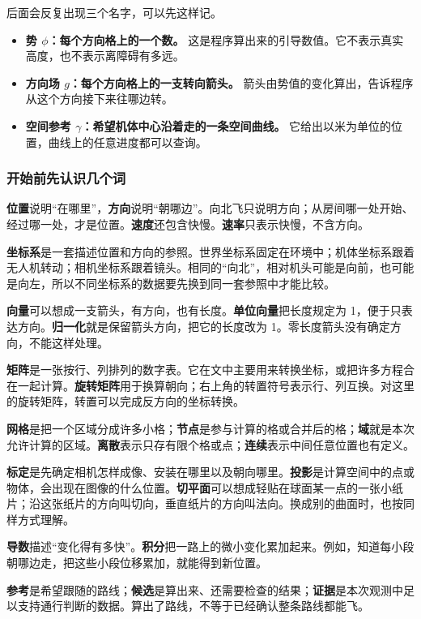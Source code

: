 \documentclass[12pt,a4paper]{article}
\numberwithin{equation}{topic}
\begin{document}
后面会反复出现三个名字，可以先这样记。
\begin{itemize}
\item \textbf{势 \(\phi\)：每个方向格上的一个数。} 这是程序算出来的引导数值。它不表示真实高度，也不表示离障碍有多远。
\item \textbf{方向场 \(g\)：每个方向格上的一支转向箭头。} 箭头由势值的变化算出，告诉程序从这个方向接下来往哪边转。
\item \textbf{空间参考 \(\gamma\)：希望机体中心沿着走的一条空间曲线。} 它给出以米为单位的位置，曲线上的任意进度都可以查询。
\end{itemize}


\subsubsection*{开始前先认识几个词}
\textbf{位置}说明“在哪里”，\textbf{方向}说明“朝哪边”。向北飞只说明方向；从房间哪一处开始、经过哪一处，才是位置。\textbf{速度}还包含快慢。\textbf{速率}只表示快慢，不含方向。

\textbf{坐标系}是一套描述位置和方向的参照。世界坐标系固定在环境中；机体坐标系跟着无人机转动；相机坐标系跟着镜头。相同的“向北”，相对机头可能是向前，也可能是向左，所以不同坐标系的数据要先换到同一套参照中才能比较。

\textbf{向量}可以想成一支箭头，有方向，也有长度。\textbf{单位向量}把长度规定为 1，便于只表达方向。\textbf{归一化}就是保留箭头方向，把它的长度改为 1。零长度箭头没有确定方向，不能这样处理。

\textbf{矩阵}是一张按行、列排列的数字表。它在文中主要用来转换坐标，或把许多方程合在一起计算。\textbf{旋转矩阵}用于换算朝向；右上角的转置符号表示行、列互换。对这里的旋转矩阵，转置可以完成反方向的坐标转换。

\textbf{网格}是把一个区域分成许多小格；\textbf{节点}是参与计算的格或合并后的格；\textbf{域}就是本次允许计算的区域。\textbf{离散}表示只存有限个格或点；\textbf{连续}表示中间任意位置也有定义。

\textbf{标定}是先确定相机怎样成像、安装在哪里以及朝向哪里。\textbf{投影}是计算空间中的点或物体，会出现在图像的什么位置。\textbf{切平面}可以想成轻贴在球面某一点的一张小纸片；沿这张纸片的方向叫切向，垂直纸片的方向叫法向。换成别的曲面时，也按同样方式理解。

\textbf{导数}描述“变化得有多快”。\textbf{积分}把一路上的微小变化累加起来。例如，知道每小段朝哪边走，把这些小段位移累加，就能得到新位置。

\textbf{参考}是希望跟随的路线；\textbf{候选}是算出来、还需要检查的结果；\textbf{证据}是本次观测中足以支持通行判断的数据。算出了路线，不等于已经确认整条路线都能飞。
\end{document}
